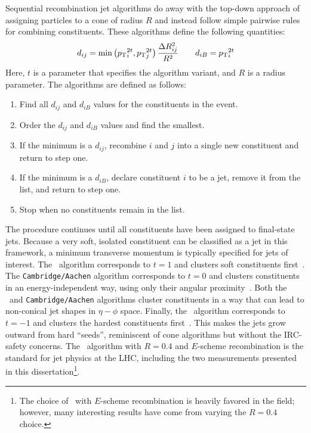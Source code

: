 Sequential recombination jet algorithms do away with the top-down approach of assigning particles to a cone of radius $R$ and instead follow simple pairwise rules for combining constituents.
These algorithms define the following quantities:
\begin{equation}
    \label{eq:seq_jet_clust}
    d_{ij} = \min\left(p_{\text{T}}{}_{i}^{2t},p_{\text{T}}{}_{j}^{2t}\right)\frac{\Delta R^2_{ij}}{R^2}
    \qquad d_{iB} = p_{\text{T}}{}_{i}^{2t}
\end{equation}
Here, $t$ is a parameter that specifies the algorithm variant, and $R$ is a radius parameter.
The algorithms are defined as follows:
\begin{enumerate}
    \item Find all $d_{ij}$ and $d_{iB}$ values for the constituents in the event.
    \item Order the $d_{ij}$ and $d_{iB}$ values and find the smallest.
    \item If the minimum is a $d_{ij}$, recombine $i$ and $j$ into a single new constituent and return to step one.
    \item If the minimum is a $d_{iB}$, declare constituent $i$ to be a jet, remove it from the list, and return to step one.
    \item Stop when no constituents remain in the list.
\end{enumerate}

The procedure continues until all constituents have been assigned to final-state jets.
Because a very soft, isolated constituent can be classified as a jet in this framework, a minimum transverse momentum is typically specified for jets of interest.
The \kt\ algorithm corresponds to $t=1$ and clusters soft constituents first~\cite{Jet:KT}.
The \texttt{Cambridge/Aachen} algorithm corresponds to $t=0$ and clusters constituents in an energy-independent way, using only their angular proximity~\cite{Jet:CA}.
Both the \kt\ and \texttt{Cambridge/Aachen} algorithms cluster constituents in a way that can lead to non-conical jet shapes in $\eta-\phi$ space.
Finally, the \antikt\ algorithm corresponds to $t=-1$ and clusters the hardest constituents first~\cite{Cacciari:2008gp}.
This makes the jets grow outward from hard ``seeds'', reminiscent of cone algorithms but without the IRC-safety concerns.
The \antikt\ algorithm with $R=0.4$ and $E$-scheme recombination is the standard for jet physics at the LHC, including the two measurements presented in this dissertation\footnote{The choice of \antikt\ with $E$-scheme recombination is heavily favored in the field; however, many interesting results have come from varying the $R=0.4$ choice. }.

